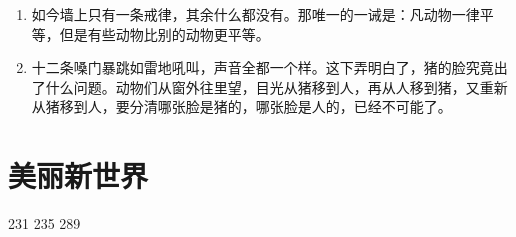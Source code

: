 \documentclass[UTF8]{ctexart}
\begin{document}
\begin{enumerate}
			\item 如今墙上只有一条戒律，其余什么都没有。那唯一的一诫是：凡动物一律平等，但是有些动物比别的动物更平等。
			
			\item 十二条嗓门暴跳如雷地吼叫，声音全都一个样。这下弄明白了，猪的脸究竟出了什么问题。动物们从窗外往里望，目光从猪移到人，再从人移到猪，又重新从猪移到人，要分清哪张脸是猪的，哪张脸是人的，已经不可能了。
			
		\end{enumerate}
	
	\newpage
	
		\section{美丽新世界}
		
			                                                       231 235 289
\end{document}
